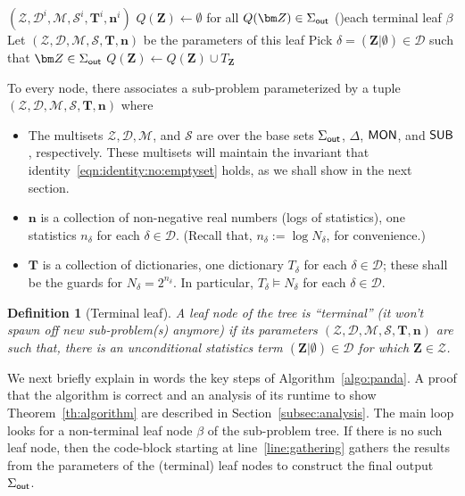 \documentclass[10pt,a4paper]{article}
\newtheorem{definition}{Definition}[section]
\newcommand{\calM}{\mathcal M}
\newcommand{\calS}{\mathcal S}
\newcommand{\calD}{\mathcal D}
\newcommand{\calZ}{\mathcal Z}
\newcommand{\out}{\text{\sf out}}
\newcommand{\mon}{\text{\sf MON}}
\newcommand{\sub}{\text{\sf SUB}}
\begin{document}
{\begin{algorithm}
{{{                             $(\calZ, \calD^i, \calM, \calS^i, \bm T^i, \bm n^i)$\;
                   }
              }
            }
            \;
   $Q(\bm Z) \leftarrow \emptyset$ for all $Q(\bm Z) \in \Sigma_{\out}$ \label{line:gathering}\;
          \For(){each terminal leaf $\beta$}{
             Let $(\calZ, \calD, \calM, \calS, \bm T, \bm n)$ be the parameters of this leaf\;
             Pick $\delta = (\bm Z | \emptyset) \in \calD$ such that
                   $\bm Z \in \Sigma_{\out}$ 
             $Q(\bm Z) \leftarrow Q(\bm Z) \cup T_{\bm Z}$ \label{line:got:it}\;
                 }
\end{algorithm}
}

To every node, there associates a sub-problem parameterized by
a tuple $(\calZ, \calD, \calM, \calS, \bm T, \bm n)$ where
\begin{itemize}
  \item The multisets $\calZ, \calD, \calM$, and $\calS$ are over the
  base sets $\Sigma_{\out}$, $\Delta$, $\mon$, and $\sub$, respectively.
  These multisets will maintain the invariant that identity~\eqref{eqn:identity:no:emptyset} holds,
  as we shall show in the next section.
  \item $\bm n$ is a collection of non-negative real numbers (logs of statistics), one
  statistics $n_\delta$ for each $\delta \in \calD$.
  (Recall that, $n_\delta := \log N_\delta$, for convenience.)
  \item $\bm T$ is a collection of dictionaries, one
  dictionary $T_\delta$ for each $\delta \in \calD$; these shall be the guards
  for $N_\delta = 2^{n_\delta}$. In particular, $T_\delta\models N_\delta$ for each $\delta \in \calD$.
\end{itemize}

\begin{definition}[Terminal leaf]
    \label{defn:terminal:leaf}
A leaf node of the tree is ``terminal'' (it won't spawn off new sub-problem(s) anymore)
if its parameters
$(\calZ, \calD, \calM, \calS, \bm T, \bm n)$ are such that, there is an unconditional
statistics term $(\bm Z | \emptyset) \in \calD$ for which $\bm Z \in \calZ$.
\end{definition}

We next briefly explain in words the key steps of Algorithm~\ref{algo:panda}. A proof that
the algorithm is correct and an analysis of its runtime to show Theorem~\ref{th:algorithm}
are described in Section~\ref{subsec:analysis}.
%
The main loop looks for a non-terminal leaf node $\beta$ of the sub-problem tree. If there
is no such leaf node, then the code-block starting at line~\ref{line:gathering} gathers
the results from the parameters of the (terminal) leaf nodes to construct the final output
$\Sigma_\out$.
\end{document}
